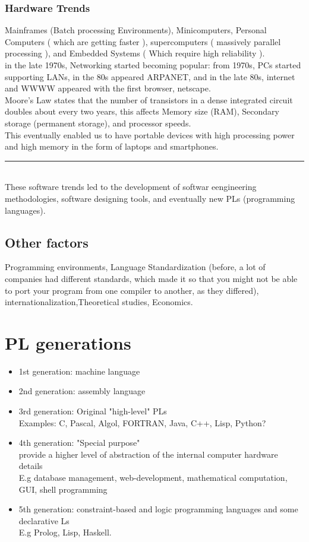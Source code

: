         \subsubsection{Hardware Trends}
        Mainframes (Batch processing Environments), Minicomputers, Personal Computers ( which are getting faster ), supercomputers ( massively parallel processing ), and Embedded Systems ( Which require high reliability ).\\
        in the late 1970s, Networking started becoming popular: from 1970s, PCs started supporting LANs, in the 80s appeared ARPANET, and in the late 80s, internet and WWWW appeared with the first browser, netscape.\\
        Moore's Law states that the number of transistors in a dense integrated circuit doubles about every two years, this affects Memory size (RAM), Secondary storage (permanent storage), and processor speeds.\\ This eventually enabled us to have portable devices with high processing power and high memory in the form of laptops and smartphones.\\ \par\noindent\rule{\textwidth}{0.4pt} \\ 

        These software trends led to the development of softwar eengineering methodologies, software designing tools, and eventually new PLs (programming languages).\\
        \subsection{Other factors}
        Programming environments, Language Standardization (before, a lot of companies had different standards, which made it so that you might not be able to port your program from one compiler to another, as they differed), internationalization,Theoretical studies, Economics.

    \section{PL generations}
    \begin{itemize}
        \item 1st generation: machine language
        \item 2nd generation: assembly language
        \item 3rd generation: Original "high-level" PLs \\ Examples: C, Pascal, Algol, FORTRAN, Java, C++, Lisp, Python?
        \item 4th generation: "Special purpose" \\ provide a higher level of abstraction of the internal computer hardware details \\ E.g database management, web-development, mathematical computation, GUI, shell programming
        \item 5th generation: constraint-based and logic programming languages and some declarative Ls \\ E.g Prolog, Lisp, Haskell.
    \end{itemize}


